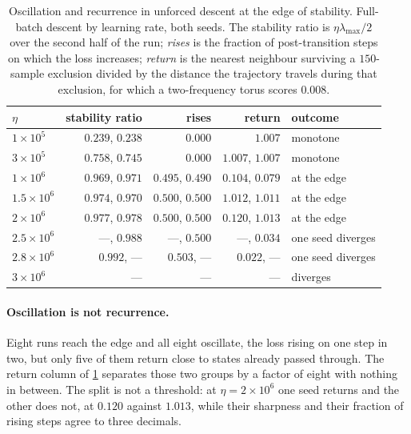 \documentclass{article}
\begin{document}
\begin{table}[H]
\centering
\caption{Oscillation and recurrence in unforced descent at the edge of stability. Full-batch
descent by learning rate, both seeds. The stability ratio is
$\eta\lambda_{\max}/2$ over the second half of the run; \emph{rises} is the fraction of
post-transition steps on which the loss increases; \emph{return} is the nearest neighbour surviving
a $150$-sample exclusion divided by the distance the trajectory travels during that exclusion, for
which a two-frequency torus scores $0.008$.}
\label{tab:eos}
\begin{tabular}{lrrrl}
\toprule
$\eta$ & stability ratio & rises & return & outcome \\
\midrule
$1 \times 10^{5}$   & $0.239$, $0.238$ & $0.000$          & $1.007$          & monotone \\
$3 \times 10^{5}$   & $0.758$, $0.745$ & $0.000$          & $1.007$, $1.007$ & monotone \\
$1 \times 10^{6}$   & $0.969$, $0.971$ & $0.495$, $0.490$ & $0.104$, $0.079$ & at the edge \\
$1.5 \times 10^{6}$ & $0.974$, $0.970$ & $0.500$, $0.500$ & $1.012$, $1.011$ & at the edge \\
$2 \times 10^{6}$   & $0.977$, $0.978$ & $0.500$, $0.500$ & $0.120$, $1.013$ & at the edge \\
$2.5 \times 10^{6}$ & ---, $0.988$     & ---, $0.500$     & ---, $0.034$     & one seed diverges \\
$2.8 \times 10^{6}$ & $0.992$, ---     & $0.503$, ---     & $0.022$, ---     & one seed diverges \\
$3 \times 10^{6}$   & ---              & ---              & ---              & diverges \\
\bottomrule
\end{tabular}
\end{table}

\paragraph{Oscillation is not recurrence.} Eight runs reach the edge and all eight oscillate, the
loss rising on one step in two, but only five of them return close to states already passed
through. The return column of \cref{tab:eos} separates those two groups by a factor of eight with
nothing in between. The split is not a threshold: at $\eta = 2 \times 10^{6}$ one seed returns
and the other does not, at $0.120$ against $1.013$, while their sharpness and their fraction of
rising steps agree to three decimals.
\end{document}
